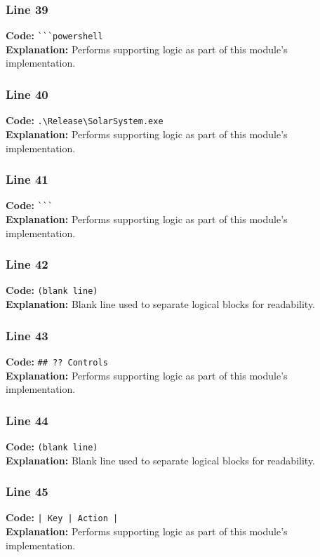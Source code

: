 \documentclass[11pt,a4paper]{article}
\begin{document}
\subsubsection*{Line 39}
\textbf{Code:} \verb|```powershell|\\
\textbf{Explanation:} Performs supporting logic as part of this module's implementation.

\subsubsection*{Line 40}
\textbf{Code:} \verb|.\Release\SolarSystem.exe|\\
\textbf{Explanation:} Performs supporting logic as part of this module's implementation.

\subsubsection*{Line 41}
\textbf{Code:} \verb|```|\\
\textbf{Explanation:} Performs supporting logic as part of this module's implementation.

\subsubsection*{Line 42}
\textbf{Code:} \texttt{(blank line)}\\
\textbf{Explanation:} Blank line used to separate logical blocks for readability.

\subsubsection*{Line 43}
\textbf{Code:} \verb|## ?? Controls|\\
\textbf{Explanation:} Performs supporting logic as part of this module's implementation.

\subsubsection*{Line 44}
\textbf{Code:} \texttt{(blank line)}\\
\textbf{Explanation:} Blank line used to separate logical blocks for readability.

\subsubsection*{Line 45}
\textbf{Code:} \verb!| Key | Action |!\\
\textbf{Explanation:} Performs supporting logic as part of this module's implementation.
\end{document}
